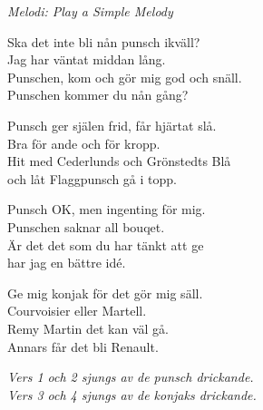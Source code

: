 {\footnotesize\textit{Melodi: Play a Simple Melody}}\par
\vspace{10pt}
Ska det inte bli nån punsch ikväll?\\
Jag har väntat middan lång.\\
Punschen, kom och gör mig god och snäll.\\
Punschen kommer du nån gång?\par
\vspace{10pt}
Punsch ger själen frid, får hjärtat slå.\\
Bra för ande och för kropp.\\
Hit med Cederlunds och Grönstedts Blå\\
och låt Flaggpunsch gå i topp.\par
\vspace{10pt}
Punsch OK, men ingenting för mig.\\
Punschen saknar all bouqet.\\
Är det det som du har tänkt att ge\\
har jag en bättre idé.\par
\vspace{10pt}
Ge mig konjak för det gör mig säll.\\
Courvoisier eller Martell.\\
Remy Martin det kan väl gå.\\
Annars får det bli Renault.\par
\vspace{10pt}
{\footnotesize\textit{Vers 1 och 2 sjungs av de punsch drickande.\\Vers 3 och 4 sjungs av de konjaks drickande.}}
